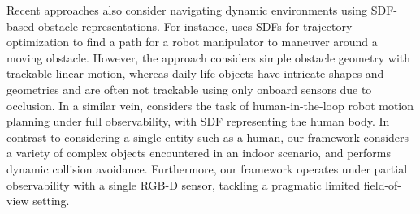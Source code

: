 Recent approaches also consider navigating dynamic environments using SDF-based obstacle representations.
For instance, \cite{finean2021predicted} uses SDFs for trajectory optimization to find a path for a robot manipulator to maneuver around a moving obstacle.
However, the approach considers simple obstacle geometry with trackable linear motion, whereas daily-life objects have intricate shapes and geometries and are often not trackable using only onboard sensors due to occlusion.
In a similar vein, \cite{liu2022regularized} considers the task of human-in-the-loop robot motion planning under full observability, with SDF representing the human body.
In contrast to considering a single entity such as a human, our framework considers a variety of complex objects encountered in an indoor scenario, and performs dynamic collision avoidance.
Furthermore, our framework operates under partial observability with a single RGB-D sensor, tackling a pragmatic limited field-of-view setting.
